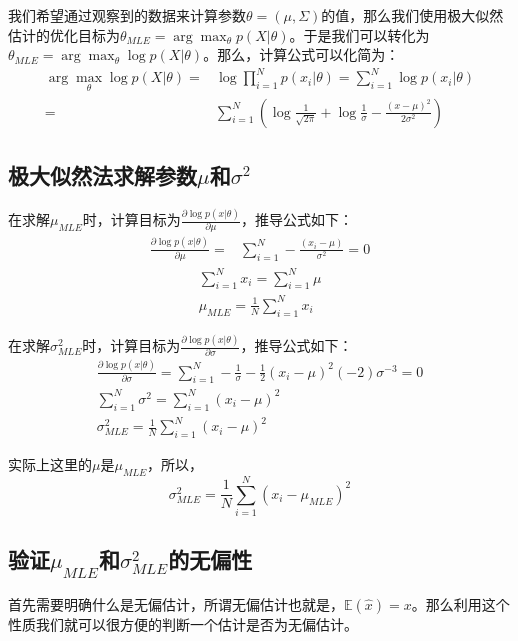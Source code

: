 \documentclass[a4paper]{article}
\numberwithin{equation}{section}
\begin{document}
我们希望通过观察到的数据来计算参数$\theta=(\mu,\Sigma)$的值，那么我们使用极大似然估计的优化目标为$\theta_{MLE}=\arg\max_{\theta}p(X|\theta)$。于是我们可以转化为$\theta_{MLE}=\arg\max_{\theta}\log p(X|\theta)$。那么，计算公式可以化简为：
\begin{align}
    \arg\max_{\theta}\log p(X|\theta) = & \log \prod_{i=1}^N p(x_i|\theta)=\sum_{i=1}^N \log p(x_i|\theta) \\
    = & \sum_{i=1}^N \left(\log \frac{1}{\sqrt{2\pi}} + \log \frac{1}{\sigma} - \frac{(x-\mu)^2}{2\sigma^2} \right)
\end{align}

\subsection{极大似然法求解参数$\mu$和$\sigma^2$}
在求解$\mu_{MLE}$时，计算目标为$\frac{\partial\log p(x|\theta)}{\partial \mu}$，推导公式如下：
\begin{align}
    \frac{\partial\log p(x|\theta)}{\partial \mu} = & \sum_{i=1}^N - \frac{(x_i-\mu)}{\sigma^2} = 0
\end{align}
\begin{gather}
    \sum_{i=1}^N x_i =  \sum_{i=1}^N \mu \\
    \mu_{MLE} =  \frac{1}{N}\sum_{i=1}^N x_i
\end{gather}

在求解$\sigma^2_{MLE}$时，计算目标为$\frac{\partial\log p(x|\theta)}{\partial \sigma}$，推导公式如下：
\begin{gather}
    \frac{\partial\log p(x|\theta)}{\partial \sigma} 
     = \sum_{i=1}^N - \frac{1}{\sigma} - \frac{1}{2}(x_i-\mu)^2(-2)\sigma^{-3} = 0 \\
     \sum_{i=1}^N  \sigma^2 = \sum_{i=1}^N (x_i-\mu)^2 \\
     \sigma^2_{MLE} = \frac{1}{N} \sum_{i=1}^N (x_i-\mu)^2 
\end{gather}

实际上这里的$\mu$是$\mu_{MLE}$，所以，
\begin{equation}
    \sigma^2_{MLE} = \frac{1}{N} \sum_{i=1}^N (x_i-\mu_{MLE})^2 
\end{equation}

\subsection{验证$\mu_{MLE}$和$\sigma^2_{MLE}$的无偏性}
首先需要明确什么是无偏估计，所谓无偏估计也就是，$\mathbb{E}(\hat{x})=x$。那么利用这个性质我们就可以很方便的判断一个估计是否为无偏估计。
\end{document}
